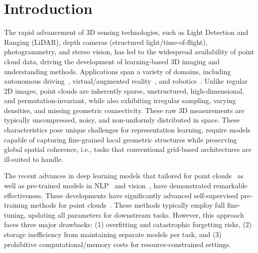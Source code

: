 \section{Introduction}
\label{sec:intro}
% 

The rapid advancement of 3D sensing technologies, such as Light Detection and Ranging (LiDAR), depth cameras (structured light/time-of-flight), photogrammetry, and stereo vision, has led to the widespread availability of point cloud data, driving the development of learning-based 3D imaging and understanding methods. Applications span a variety of domains, including autonomous driving~\cite{yang2024visual,song2024graphbev,chen20203d}, virtual/augmented reality~\cite{casado2023rendering,garrido2021point}, and robotics~\cite{wang2021trajectory,chen2022direct,christen2023learning}. 
Unlike regular 2D images, point clouds are inherently sparse, unstructured, high-dimensional, and permutation-invariant, while also exhibiting irregular sampling, varying densities, and missing geometric connectivity. These raw 3D measurements are typically uncompressed, noisy, and non-uniformly distributed in space. These characteristics pose unique challenges for representation learning, require models capable of capturing fine-grained local geometric structures while preserving global spatial coherence, i.e., tasks that conventional grid-based architectures are ill-suited to handle.

The recent advances in deep learning models that tailored for point clouds~\cite{qi2017pointnet, qi2017pointnet++, li2018pointcnn, qian2022pointnext, wang2019dynamic, wu2024point} as well as pre-trained models in NLP~\cite{devlin2018bert, brown2020language} and vision~\cite{he2020momentum, chen2020improved}, have demonstrated remarkable effectiveness. These developments have significantly advanced self-supervised pre-training methods for point clouds~\cite{pang2022masked, yu2022point, zhang2022point, afham2022crosspoint}.
These methods typically employ full fine-tuning, updating all parameters for downstream tasks. However, this approach faces three major drawbacks: (1) overfitting and catastrophic forgetting risks, (2) storage inefficiency from maintaining separate models per task, and (3) prohibitive computational/memory costs for resource-constrained settings.

